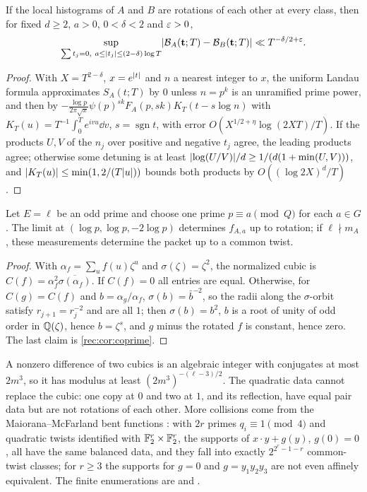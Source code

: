 \begin{theorem}\label{rec:thm:homuniform}
If the local histograms of $A$ and $B$ are rotations of each other at every class, then for fixed
$d\ge2$, $a>0$, $0<\delta<2$ and $\varepsilon>0$,
\[
 \sup_{\sum t_j=0,\ a\le\lvert t_j\rvert\le(2-\delta)\log T}\lvert\mathcal B_A(\mathbf t;T)-\mathcal B_B(\mathbf t;T)\rvert
 \ll T^{-\delta/2+\varepsilon}.
\]
\end{theorem}

\begin{proof}
With $X=T^{2-\delta}$, $x=e^{\lvert t\rvert}$ and $n$ a nearest integer to $x$, the uniform Landau formula
approximates $S_A(t;T)$ by $0$ unless $n=p^k$ is an unramified prime power, and then by
$-\frac{\log p}{2\pi\sqrt x}\psi(p)^{sk}F_A(p,sk)K_T(t-s\log n)$ with $K_T(u)=T^{-1}\int_0^Te^{ivu}\dd v$,
$s=\operatorname{sgn}t$, with error $O(X^{1/2+\eta}\log(2XT)/T)$. If the products $U,V$ of the $n_j$
over positive and negative $t_j$ agree, the leading products agree; otherwise some detuning is at
least $\lvert\log(U/V)\rvert/d\ge1/(d(1+\min(U,V)))$, and $\lvert K_T(u)\rvert\le\min(1,2/(T\lvert u\rvert))$ bounds both
products by $O((\log2X)^d/T)$.
\end{proof}

\begin{theorem}\label{rec:thm:cubic}
Let $E=\ell$ be an odd prime and choose one prime $p\equiv a\pmod Q$ for each $a\in G$. The limit at
$(\log p,\log p,-2\log p)$ determines $f_{A,a}$ up to rotation; if $\ell\nmid m_A$, these measurements
determine the packet up to a common twist.
\end{theorem}

\begin{proof}
With $\alpha_f=\sum_uf(u)\zeta^u$ and $\sigma(\zeta)=\zeta^2$, the normalized cubic is
$C(f)=\alpha_f^2\overline{\sigma(\alpha_f)}$. If $C(f)=0$ all entries are equal. Otherwise, for
$C(g)=C(f)$ and $b=\alpha_g/\alpha_f$, $\sigma(b)=\bar b^{-2}$, so the radii along the
$\sigma$-orbit satisfy $r_{j+1}=r_j^{-2}$ and are all $1$; then $\sigma(b)=b^2$, $b$ is a root of
unity of odd order in $\mathbb{Q}(\zeta)$, hence $b=\zeta^s$, and $g$ minus the rotated $f$ is constant, hence
zero. The last claim is \cref{rec:cor:coprime}.
\end{proof}

A nonzero difference of two cubics is an algebraic integer with conjugates at most $2m^3$, so it
has modulus at least $(2m^3)^{-(\ell-3)/2}$. The quadratic data cannot replace the cubic: one copy
at $0$ and two at $1$, and its reflection, have equal pair data but are not rotations of each other.
More collisions come from the Maiorana--McFarland bent functions \cite{Dillon1974Elementary}: with
$2r$ primes $q_i\equiv1\pmod4$ and quadratic twists identified with $\mathbb{F}_2^r\times\mathbb{F}_2^r$, the supports
of $x\cdot y+g(y)$, $g(0)=0$, all have the same balanced data, and they fall into exactly
$2^{2^r-1-r}$ common-twist classes; for $r\ge3$ the supports for $g=0$ and $g=y_1y_2y_3$ are not even
affinely equivalent. The finite enumerations are
 and
.

